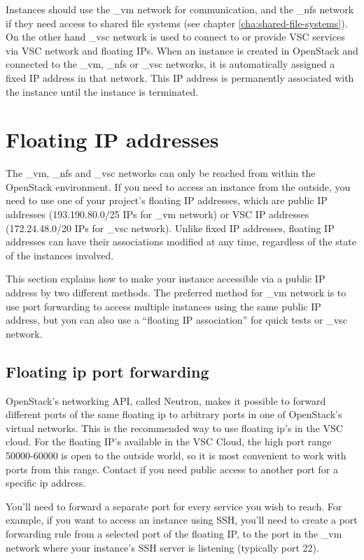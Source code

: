 Instances should use the \_vm network for communication, and the \_nfs
network if they need access to shared file systems (see chapter
\ref{cha:shared-file-systems}). On the other hand \_vsc network is used to
connect to or provide VSC services via VSC network and floating IPs.
When an instance is created in
\gls{OpenStack} and connected to the \_vm, \_nfs or \_vsc networks, it is
automatically assigned a fixed IP address in that network. This IP
address is permanently associated with the instance until the instance
is terminated.

\section{Floating IP addresses}\label{sec:floating-ip}
The \_vm, \_nfs and \_vsc networks can only be reached from within the
OpenStack environment.  If you need to access an instance from the
outside, you need to use one of your project's floating IP addresses,
which are public IP addresses (193.190.80.0/25 IPs for \_vm network) or
VSC IP addresses (172.24.48.0/20 IPs for \_vsc network).
Unlike fixed IP addresses, floating IP addresses can have their associations
modified at any time, regardless of the state of the instances involved.

This section explains how to make your instance accessible via a
public IP address by two different methods. The preferred method for \_vm
network is to use port forwarding to access multiple instances using the
same public IP address, but you can also use a ``floating IP association''
for quick tests or \_vsc network.

\subsection*{Floating ip port forwarding}
OpenStack's networking API, called Neutron, makes it possible to
forward different ports of the same floating ip to arbitrary ports in
one of OpenStack's virtual networks.  This is the recommended way to
use floating ip's in the VSC cloud.  For the floating IP's available
in the VSC Cloud, the high port range 50000-60000 is open to the
outside world, so it is most convenient to work with ports from this
range.  Contact \cloudinfo if you need public access to another port
for a specific ip address.

You'll need to forward a separate port for every service you wish to
reach.  For example, if you want to access an instance using SSH,
you'll need to create a port forwarding rule from a selected port of
the floating IP, to the port in the \_vm network where your instance's
SSH server is listening (typically port 22).

